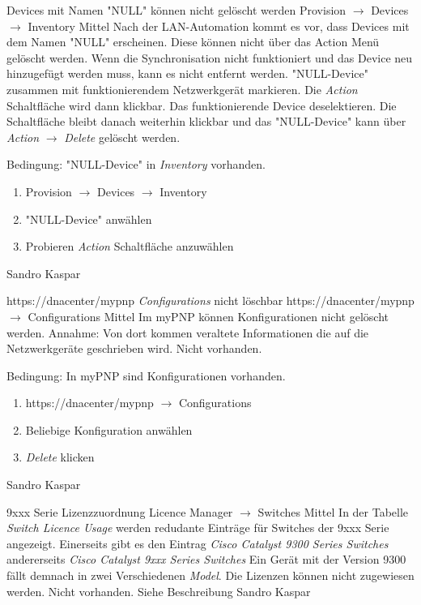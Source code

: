 \bugreport
{Devices mit Namen "NULL" können nicht gelöscht werden}
{Provision $\rightarrow$ Devices $\rightarrow$ Inventory}
{Mittel}
{Nach der LAN-Automation kommt es vor, dass Devices mit dem Namen "NULL" erscheinen. Diese können nicht über das Action Menü gelöscht werden.}
{Wenn die Synchronisation nicht funktioniert und das Device neu hinzugefügt werden muss, kann es nicht entfernt werden.}
{"NULL-Device" zusammen mit funktionierendem Netzwerkgerät markieren. Die \textit{Action} Schaltfläche wird dann klickbar. Das funktionierende Device deselektieren. Die Schaltfläche bleibt danach weiterhin klickbar und das "NULL-Device" kann über \textit{Action} $\rightarrow$ \textit{Delete} gelöscht werden.}
{
	Bedingung: "NULL-Device" in \textit{Inventory} vorhanden.
	\begin{enumerate}
		\item Provision $\rightarrow$ Devices $\rightarrow$ Inventory
		\item "NULL-Device" anwählen
		\item Probieren \textit{Action} Schaltfläche anzuwählen
	\end{enumerate}
}
{Sandro Kaspar}
{}

\bugreport
{https://dnacenter/mypnp \textit{Configurations} nicht löschbar}
{https://dnacenter/mypnp $\rightarrow$ Configurations}
{Mittel}
{Im myPNP können Konfigurationen nicht gelöscht werden.}
{Annahme: Von dort kommen veraltete Informationen die auf die Netzwerkgeräte geschrieben wird.}
{Nicht vorhanden.}
{
	Bedingung: In myPNP sind Konfigurationen vorhanden.
	\begin{enumerate}
		\item https://dnacenter/mypnp $\rightarrow$ Configurations
		\item Beliebige Konfiguration anwählen
		\item \textit{Delete} klicken
	\end{enumerate}
}
{Sandro Kaspar}
{}


\bugreport
{9xxx Serie Lizenzzuordnung}
{Licence Manager $\rightarrow$ Switches}
{Mittel}
{In der Tabelle \textit{Switch Licence Usage} werden redudante Einträge für Switches der 9xxx Serie angezeigt. Einerseits gibt es den Eintrag \textit{Cisco Catalyst 9300 Series Switches} andererseits \textit{Cisco Catalyst 9xxx Series Switches} Ein Gerät mit der Version 9300 fällt demnach in zwei Verschiedenen \textit{Model}.}
{Die Lizenzen können nicht zugewiesen werden.}
{Nicht vorhanden.}
{
Siehe Beschreibung
}
{Sandro Kaspar}
{}




